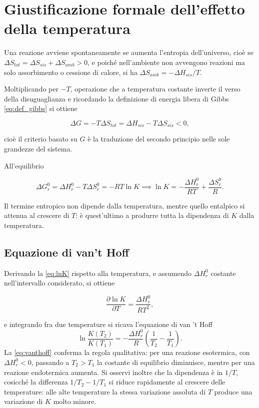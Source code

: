 \section{Giustificazione formale dell'effetto della temperatura}

Una reazione avviene spontaneamente se aumenta l'entropia dell'universo, cioè se $\Delta S_{tot} = \Delta S_{sis} + \Delta S_{amb} > 0$, e poiché nell'ambiente non avvengono reazioni ma solo assorbimento o cessione di calore, si ha $\Delta S_{amb} = -\Delta H_{sis}/T$.

Moltiplicando per $-T$, operazione che a temperatura costante inverte il verso della disuguaglianza e ricordando la definizione di energia libera di Gibbs \eqref{eq:def_gibbs} si ottiene

\begin{equation}
    \Delta G = -T\Delta S_{tot} = \Delta H_{sis} - T\Delta S_{sis} < 0 ,
    \label{eq:legame_G_Stot}
\end{equation}

cioè il criterio basato su $G$ è la traduzione del secondo principio nelle sole grandezze del sistema.

All'equilibrio

\begin{equation}
    \Delta G^0_r = \Delta H^0_r - T\Delta S^0_r = -RT\ln K  \implies \ln K = -\frac{\Delta H^0_r}{RT} + \frac{\Delta S^0_r}{R} .
    \label{eq:lnK}
\end{equation}

Il termine entropico non dipende dalla temperatura, mentre quello entalpico si attenua al crescere di $T$: è quest'ultimo a produrre tutta la dipendenza di $K$ dalla temperatura.

\subsection{Equazione di van't Hoff}

Derivando la \eqref{eq:lnK} rispetto alla temperatura, e assumendo $\Delta H^0_r$ costante nell'intervallo considerato, si ottiene

\begin{equation}
    \frac{\partial \ln K}{\partial T} = \frac{\Delta H^0_r}{RT^2} ,
    \label{eq:vanthoff_diff}
\end{equation}

e integrando fra due temperature si ricava l'equazione di van 't Hoff
\begin{equation}
    \ln\frac{K(T_2)}{K(T_1)} = -\frac{\Delta H^0_r}{R}\left(\frac{1}{T_2} - \frac{1}{T_1}\right) .
    \label{eq:vanthoff}
\end{equation}
La \eqref{eq:vanthoff} conferma la regola qualitativa: per una reazione esotermica, con $\Delta H^0_r < 0$, passando a $T_2 > T_1$ la costante di equilibrio diminuisce, mentre per una reazione endotermica aumenta.
Si osservi inoltre che la dipendenza è in $1/T$, cosicché la differenza $1/T_2 - 1/T_1$ si riduce rapidamente al crescere delle temperature: alle alte temperature la stessa variazione assoluta di $T$ produce una variazione di $K$ molto minore.